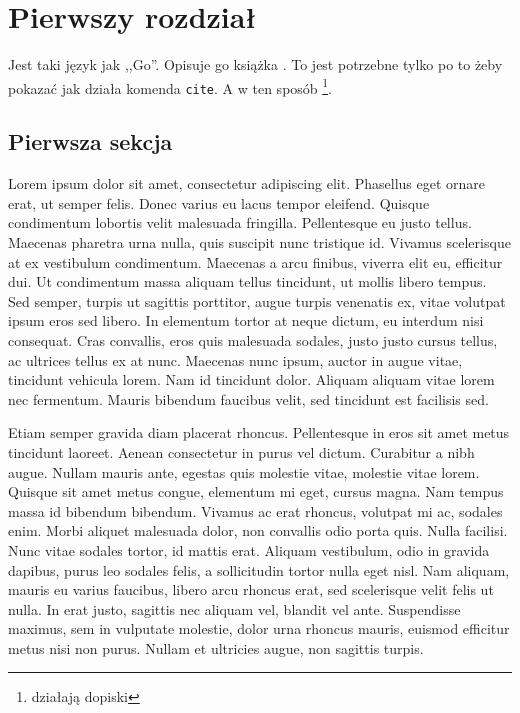 \chapter{Pierwszy rozdział}

Jest taki język jak ,,Go''. Opisuje go książka \cite{Golang}. To jest potrzebne
tylko po to żeby pokazać jak działa komenda \texttt{cite}. A w ten sposób
\footnote{działają dopiski}.

\section{Pierwsza sekcja}

Lorem ipsum dolor sit amet, consectetur adipiscing elit. Phasellus eget ornare
erat, ut semper felis. Donec varius eu lacus tempor eleifend. Quisque
condimentum lobortis velit malesuada fringilla. Pellentesque eu justo tellus.
Maecenas pharetra urna nulla, quis suscipit nunc tristique id. Vivamus
scelerisque at ex vestibulum condimentum. Maecenas a arcu finibus, viverra elit
eu, efficitur dui. Ut condimentum massa aliquam tellus tincidunt, ut mollis
libero tempus. Sed semper, turpis ut sagittis porttitor, augue turpis venenatis
ex, vitae volutpat ipsum eros sed libero. In elementum tortor at neque dictum,
eu interdum nisi consequat. Cras convallis, eros quis malesuada sodales, justo
justo cursus tellus, ac ultrices tellus ex at nunc. Maecenas nunc ipsum, auctor
in augue vitae, tincidunt vehicula lorem. Nam id tincidunt dolor. Aliquam
aliquam vitae lorem nec fermentum. Mauris bibendum faucibus velit, sed tincidunt
est facilisis sed.

Etiam semper gravida diam placerat rhoncus. Pellentesque in eros sit amet metus
tincidunt laoreet. Aenean consectetur in purus vel dictum. Curabitur a nibh
augue. Nullam mauris ante, egestas quis molestie vitae, molestie vitae lorem.
Quisque sit amet metus congue, elementum mi eget, cursus magna. Nam tempus massa
id bibendum bibendum. Vivamus ac erat rhoncus, volutpat mi ac, sodales enim.
Morbi aliquet malesuada dolor, non convallis odio porta quis. Nulla facilisi.
Nunc vitae sodales tortor, id mattis erat. Aliquam vestibulum, odio in gravida
dapibus, purus leo sodales felis, a sollicitudin tortor nulla eget nisl. Nam
aliquam, mauris eu varius faucibus, libero arcu rhoncus erat, sed scelerisque
velit felis ut nulla. In erat justo, sagittis nec aliquam vel, blandit vel
ante. Suspendisse maximus, sem in vulputate molestie, dolor urna rhoncus
mauris, euismod efficitur metus nisi non purus. Nullam et ultricies augue, non
sagittis turpis.

